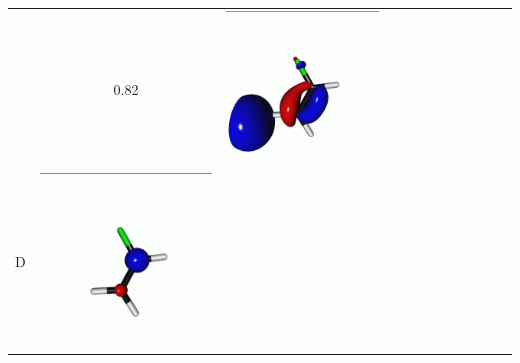 \documentclass[journal=jctcce,manuscript=article]{achemso}
\begin{document}
\begin{table}[H]
\begin{tabular}{c|ccc|cccc|cccc}
\begin{minipage}{0.2\textwidth}
     \end{minipage}
     & 0.82
     &  \begin{minipage}{0.2\textwidth}
         \centering
         \includegraphics[scale=0.10]{NTO/CH2CHF/4p.png}
     \end{minipage}
     \\
                  D &  
     \begin{minipage}{0.2\textwidth}
         \centering
         \includegraphics[scale=0.10]{NTO/CH2CHF/8h.png}

\end{minipage}
\end{tabular}
\end{table}
\end{document}
